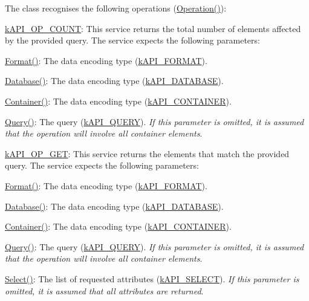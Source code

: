 The class recognises the following operations (\hyperlink{}{Operation()})\-:


\begin{DoxyItemize}
\item {\ttfamily \hyperlink{}{k\-A\-P\-I\-\_\-\-O\-P\-\_\-\-C\-O\-U\-N\-T}}\-: This service returns the total number of elements affected by the provided query. The service expects the following parameters\-: 
\begin{DoxyItemize}
\item {\ttfamily \hyperlink{}{Format()}}\-: The data encoding type (\hyperlink{}{k\-A\-P\-I\-\_\-\-F\-O\-R\-M\-A\-T}). 
\item {\ttfamily \hyperlink{}{Database()}}\-: The data encoding type (\hyperlink{}{k\-A\-P\-I\-\_\-\-D\-A\-T\-A\-B\-A\-S\-E}). 
\item {\ttfamily \hyperlink{}{Container()}}\-: The data encoding type (\hyperlink{}{k\-A\-P\-I\-\_\-\-C\-O\-N\-T\-A\-I\-N\-E\-R}). 
\item {\ttfamily \hyperlink{}{Query()}}\-: The query (\hyperlink{}{k\-A\-P\-I\-\_\-\-Q\-U\-E\-R\-Y}). {\itshape If this parameter is omitted, it is assumed that the operation will involve all container elements}. 
\end{DoxyItemize}
\item {\ttfamily \hyperlink{}{k\-A\-P\-I\-\_\-\-O\-P\-\_\-\-G\-E\-T}}\-: This service returns the elements that match the provided query. The service expects the following parameters\-: 
\begin{DoxyItemize}
\item {\ttfamily \hyperlink{}{Format()}}\-: The data encoding type (\hyperlink{}{k\-A\-P\-I\-\_\-\-F\-O\-R\-M\-A\-T}). 
\item {\ttfamily \hyperlink{}{Database()}}\-: The data encoding type (\hyperlink{}{k\-A\-P\-I\-\_\-\-D\-A\-T\-A\-B\-A\-S\-E}). 
\item {\ttfamily \hyperlink{}{Container()}}\-: The data encoding type (\hyperlink{}{k\-A\-P\-I\-\_\-\-C\-O\-N\-T\-A\-I\-N\-E\-R}). 
\item {\ttfamily \hyperlink{}{Query()}}\-: The query (\hyperlink{}{k\-A\-P\-I\-\_\-\-Q\-U\-E\-R\-Y}). {\itshape If this parameter is omitted, it is assumed that the operation will involve all container elements}. 
\item {\ttfamily \hyperlink{}{Select()}}\-: The list of requested attributes (\hyperlink{}{k\-A\-P\-I\-\_\-\-S\-E\-L\-E\-C\-T}). {\itshape If this parameter is omitted, it is assumed that all attributes are returned}. 

\end{DoxyItemize}
\end{DoxyItemize}
